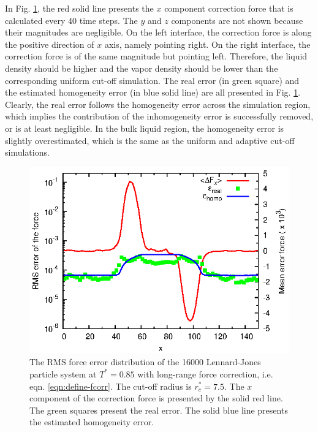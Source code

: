 \documentclass[aps,pre,preprint]{revtex4-1}
\begin{document}
In Fig. \ref{fig:tmp4}, the red solid line presents the $x$ component
correction force that is calculated every 40 time steps. The $y$ and
$z$ components are not shown because their magnitudes are negligible.
On the left interface, the correction force is along the positive
direction of $x$ axis, namely pointing right.  On the right interface,
the correction force is of the same magnitude but pointing
left. Therefore, the liquid density should be higher and the vapor
density should be lower than the corresponding uniform cut-off
simulation.  The real error (in green square) and the estimated
homogeneity error (in blue solid line) are all presented in
Fig. \ref{fig:tmp4}.  Clearly, the real error follows the homogeneity
error across the simulation region, which implies the contribution of
the inhomogeneity error is successfully removed, or is at least
negligible. In the bulk liquid region, the homogeneity error is
slightly overestimated, which is the same as the uniform and adaptive
cut-off simulations.


\begin{figure}
  \centering
  \includegraphics[]{fig/t0.85-n16000-fcorr-rc07.5-feq0200/fcorr.and.error.eps}
  \caption{ The RMS force error distribution of the 16000
    Lennard-Jones particle system at $T^\ast=0.85$ with long-range
    force correction, i.e. eqn. \eqref{eqn:define-fcorr}. The cut-off
    radius is $r^\ast_c = 7.5$. The $x$ component of the correction
    force is presented by the solid red line. The green squares
    present the real error. The solid blue line presents the estimated
    homogeneity error. }
  \label{fig:tmp4}
\end{figure}
\end{document}
